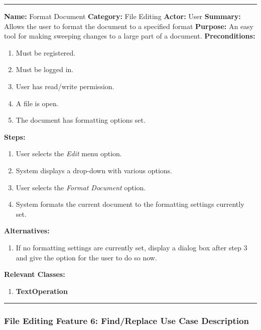 \documentclass[twoside,letterpaper]{article}
\begin{document}
\vspace{2pt}
\hrule
\vspace{8pt}
	\noindent\textbf{Name:} Format Document \newline
	\noindent\textbf{Category:} File Editing \newline
	\noindent\textbf{Actor:} User \newline
	\noindent\textbf{Summary:} Allows the user to format the document to a specified format \newline
	\noindent\textbf{Purpose:} An easy tool for making sweeping changes to a large part of a document. \newline
	\noindent\textbf{Preconditions:}
	\begin{enumerate}
		\item Must be registered.
		\item Must be logged in.
		\item User has read/write permission.
		\item A file is open.
		\item The document has formatting options set.
	\end{enumerate}
	\noindent\textbf{Steps:}
	\begin{enumerate}
		\item User selects the \textit{Edit} menu option.
		\item System displays a drop-down with various options.
		\item User selects the \textit{Format Document} option.
		\item System formats the current document to the formatting settings currently set.
	\end{enumerate}
	\noindent\textbf{Alternatives:}
	\begin{enumerate}
		\item If no formatting settings are currently set, display a dialog box after step 3 and give the option for the user to do so now.
	\end{enumerate}
	\noindent\textbf{Relevant Classes:}
	\begin{enumerate}
		\item \textbf{TextOperation}
	\end{enumerate}
\vspace{8pt}
\hrule
\newpage

\subsubsection[File Editing Feature 6: Find/Replace]{\rmfamily\bfseries\color{black}
	File Editing Feature 6: Find/Replace Use Case Description}
\hypertarget{RefHeading22059017292}{}
\end{document}
